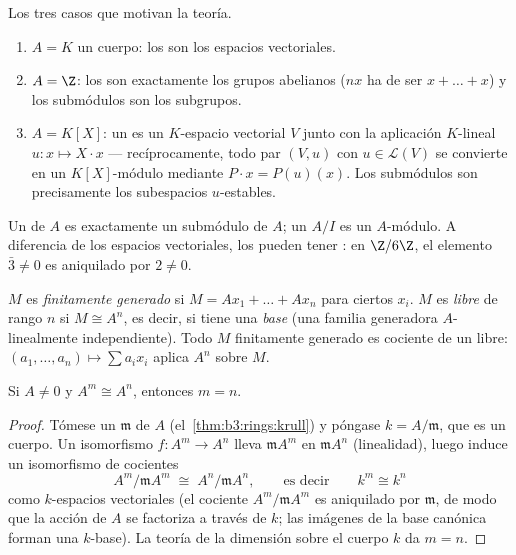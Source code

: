 \begin{example}\label{ex:b3:modules:examples}
Los tres casos que motivan la teoría.
\begin{enumerate}
  \item $A = K$ un cuerpo: los 
  son los espacios vectoriales. \item $A = \Z$: los
   son exactamente los grupos
  abelianos ($nx$ ha de ser $x + \dots + x$) y los submódulos son los
  subgrupos. \item $A = K[X]$: un 
  es un $K$-espacio vectorial $V$ junto con la aplicación $K$-lineal
  $u\colon x \mapsto X\cdot x$ --- recíprocamente, todo par $(V, u)$ con
  $u \in \mathcal L(V)$ se convierte en un $K[X]$-módulo mediante
  $P \cdot x = P(u)(x)$. Los submódulos son precisamente los subespacios
  $u$-estables.
\end{enumerate}
Un  de $A$ es exactamente un submódulo
de $A$; un  $A/I$ es un
$A$-módulo. A diferencia de los espacios vectoriales, los
 pueden tener
\emph{}: en $\Z/6\Z$, el
elemento $\bar 3 \ne 0$ es aniquilado por $2 \neq 0$.
\end{example}

\begin{definition}\label{def:b3:modules:free}
$M$ es \emph{finitamente generado} si
$M = Ax_1 + \dots + Ax_n$ para ciertos $x_i$. $M$ es
\emph{libre} de rango $n$ si $M \cong A^n$, es
decir, si tiene una \emph{base} (una familia generadora $A$-linealmente
independiente). Todo $M$ finitamente generado es cociente de un
 libre:
$(a_1, \dots, a_n) \mapsto \sum a_ix_i$ aplica $A^n$ sobre $M$.
\end{definition}

\begin{proposition}\label{prop:b3:modules:rank}
Si $A \neq 0$ y $A^m \cong A^n$, entonces $m = n$.
\end{proposition}

\begin{proof}
Tómese un 
$\mathfrak m$ de $A$ (el~\cref{thm:b3:rings:krull}) y póngase
$k = A/\mathfrak m$, que es un cuerpo. Un isomorfismo $f \colon A^m
\to A^n$ lleva $\mathfrak m A^m$ en $\mathfrak m A^n$ (linealidad),
luego induce un isomorfismo de cocientes
\[
A^m/\mathfrak m A^m \;\cong\; A^n/\mathfrak m A^n,
\qquad\text{es decir}\qquad k^m \cong k^n
\]
como $k$-espacios vectoriales (el cociente $A^m/\mathfrak m A^m$ es
aniquilado por $\mathfrak m$, de modo que la acción de $A$ se factoriza
a través de $k$; las imágenes de la base canónica forman una $k$-base).
La teoría de la dimensión sobre el cuerpo $k$ da $m = n$.
\end{proof}

